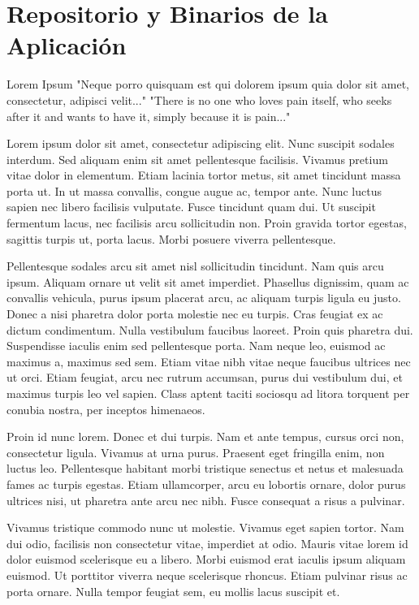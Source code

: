 \chapter{Repositorio y Binarios de la Aplicación}
\label{app:anexo_repositorio} 

Lorem Ipsum
"Neque porro quisquam est qui dolorem ipsum quia dolor sit amet, consectetur, adipisci velit..."
"There is no one who loves pain itself, who seeks after it and wants to have it, simply because it is pain..."

Lorem ipsum dolor sit amet, consectetur adipiscing elit. Nunc suscipit sodales interdum. Sed aliquam enim sit amet pellentesque facilisis. Vivamus pretium vitae dolor in elementum. Etiam lacinia tortor metus, sit amet tincidunt massa porta ut. In ut massa convallis, congue augue ac, tempor ante. Nunc luctus sapien nec libero facilisis vulputate. Fusce tincidunt quam dui. Ut suscipit fermentum lacus, nec facilisis arcu sollicitudin non. Proin gravida tortor egestas, sagittis turpis ut, porta lacus. Morbi posuere viverra pellentesque.

Pellentesque sodales arcu sit amet nisl sollicitudin tincidunt. Nam quis arcu ipsum. Aliquam ornare ut velit sit amet imperdiet. Phasellus dignissim, quam ac convallis vehicula, purus ipsum placerat arcu, ac aliquam turpis ligula eu justo. Donec a nisi pharetra dolor porta molestie nec eu turpis. Cras feugiat ex ac dictum condimentum. Nulla vestibulum faucibus laoreet. Proin quis pharetra dui. Suspendisse iaculis enim sed pellentesque porta. Nam neque leo, euismod ac maximus a, maximus sed sem. Etiam vitae nibh vitae neque faucibus ultrices nec ut orci. Etiam feugiat, arcu nec rutrum accumsan, purus dui vestibulum dui, et maximus turpis leo vel sapien. Class aptent taciti sociosqu ad litora torquent per conubia nostra, per inceptos himenaeos.

Proin id nunc lorem. Donec et dui turpis. Nam et ante tempus, cursus orci non, consectetur ligula. Vivamus at urna purus. Praesent eget fringilla enim, non luctus leo. Pellentesque habitant morbi tristique senectus et netus et malesuada fames ac turpis egestas. Etiam ullamcorper, arcu eu lobortis ornare, dolor purus ultrices nisi, ut pharetra ante arcu nec nibh. Fusce consequat a risus a pulvinar.

Vivamus tristique commodo nunc ut molestie. Vivamus eget sapien tortor. Nam dui odio, facilisis non consectetur vitae, imperdiet at odio. Mauris vitae lorem id dolor euismod scelerisque eu a libero. Morbi euismod erat iaculis ipsum aliquam euismod. Ut porttitor viverra neque scelerisque rhoncus. Etiam pulvinar risus ac porta ornare. Nulla tempor feugiat sem, eu mollis lacus suscipit et.

